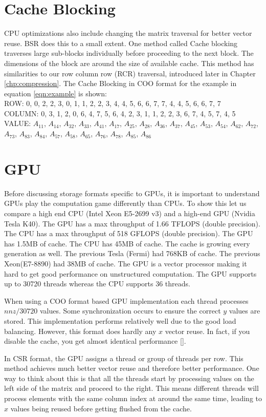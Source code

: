 \section{Cache Blocking}
\par CPU optimizations also include changing the matrix traversal for better vector reuse. BSR does this to a small extent. One method called Cache blocking traverses large sub-blocks individually before proceeding to the next block. The dimensions of the block are around the size of available cache. This method has similarities to our row column row (RCR) traversal, introduced later in Chapter \ref{chp:compression}. The Cache Blocking in COO format for the example in equation \ref{eqn:example} is shown:\\
ROW: 0, 0, 2, 2, 3, 0, 1, 1, 2, 2, 3, 4, 4, 5, 6, 6, 7, 7, 4, 4, 5, 6, 6, 7, 7\\
COLUMN: 0, 3, 1, 2, 0, 6, 4, 7, 5, 6, 4, 2, 3, 1, 1, 2, 2, 3, 6, 7, 4, 5, 7, 4, 5\\
VALUE: $A_{11}$, $A_{14}$, $A_{32}$, $A_{33}$, $A_{41}$,
$A_{17}$, $A_{25}$, $A_{28}$, $A_{36}$, $A_{37}$, $A_{45}$,
$A_{53}$,  $A_{54}$, $A_{62}$, $A_{72}$, $A_{73}$, $A_{83}$, $A_{84}$,
$A_{57}$, $A_{58}$, $A_{65}$, $A_{76}$, $A_{78}$, $A_{85}$, $A_{86}$\par
\section{GPU}
Before discussing storage formats specific to GPUs, it is important to understand GPUs play the computation game differently than CPUs. To show this let us compare a high end CPU (Intel Xeon E5-2699 v3) and a high-end GPU (Nvidia Tesla K40). The GPU has a max throughput of 1.66 TFLOPS (double precision). The CPU has a max throughput of 518 GFLOPS (double precision). The GPU has 1.5MB of cache. The CPU has 45MB of cache. The cache is growing every generation as well. The previous Tesla (Fermi) had 768KB of cache. The previous Xeon(E7-8890) had 38MB of cache. The GPU is a vector processor making it hard to get good performance on unstructured computation. The GPU supports up to 30720 threads whereas the CPU supports 36 threads. \par
    When using a COO format based GPU implementation each thread processes $nnz/30720$ values. Some synchronization occurs to ensure the correct $y$ values are stored. This implementation performs relatively well due to the good load balancing. However, this format does hardly any $x$ vector reuse. In fact, if you disable the cache, you get almost identical performance [\cite{prelim:bell}].\par
    In CSR format, the GPU assigns a thread or group of threads per row. This method achieves much better vector reuse and therefore better performance. One way to think about this is that all the threads start by processing values on the left side of the matrix and proceed to the right. This means different threads will process elements with the same column index at around the same time, leading to $x$ values being reused before getting flushed from the cache.

